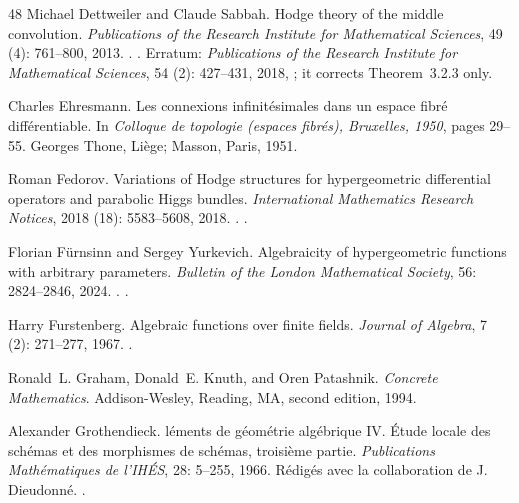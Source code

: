 \documentclass[11pt]{amsart}
\theoremstyle{definition}
\theoremstyle{remark}
\numberwithin{equation}{section}
\begin{document}
\begin{thebibliography}{48}
Michael Dettweiler and Claude Sabbah.
\newblock Hodge theory of the middle convolution.
\newblock \emph{Publications of the Research Institute for Mathematical
	Sciences}, 49 (4): 761--800, 2013.
\newblock {}.
\newblock {}.
\newblock Erratum: \emph{Publications of the Research Institute for
	Mathematical Sciences}, 54 (2): 427--431, 2018,
; it corrects Theorem~3.2.3 only.

Charles Ehresmann.
\newblock Les connexions infinit{\'e}simales dans un espace fibr{\'e}
  diff{\'e}rentiable.
\newblock In \emph{Colloque de topologie (espaces fibr{\'e}s), Bruxelles,
  1950}, pages 29--55. Georges Thone, Li{\`e}ge; Masson, Paris, 1951.

Roman Fedorov.
\newblock Variations of {H}odge structures for hypergeometric differential
  operators and parabolic {H}iggs bundles.
\newblock \emph{International Mathematics Research Notices}, 2018
  (18): 5583--5608, 2018.
\newblock {}.
\newblock {}.

Florian F{\"u}rnsinn and Sergey Yurkevich.
\newblock Algebraicity of hypergeometric functions with arbitrary parameters.
\newblock \emph{Bulletin of the London Mathematical Society}, 56:
  2824--2846, 2024.
\newblock {}.
\newblock {}.

Harry Furstenberg.
\newblock Algebraic functions over finite fields.
\newblock \emph{Journal of Algebra}, 7 (2): 271--277, 1967.
\newblock {}.

Ronald~L. Graham, Donald~E. Knuth, and Oren Patashnik.
\newblock \emph{Concrete Mathematics}.
\newblock Addison-Wesley, Reading, MA, second edition, 1994.

Alexander Grothendieck.
l{\'e}ments de g{\'e}om{\'e}trie alg{\'e}brique {IV}.
  {{\'E}tude} locale des sch{\'e}mas et des morphismes de sch{\'e}mas,
  troisi{\`e}me partie.
\newblock \emph{Publications Math{\'e}matiques de l'IH{\'E}S}, 28:
  5--255, 1966{}.
\newblock R{\'e}dig{\'e}s avec la collaboration de J. Dieudonn{\'e}.
\newblock {}.


\end{thebibliography}
\end{document}
